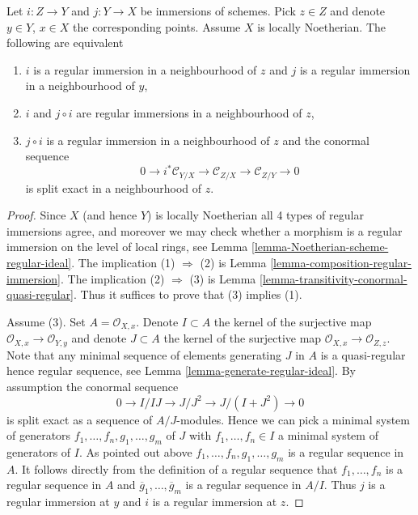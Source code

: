 \begin{lemma}
\label{lemma-extra-permanence-regular-immersion-noetherian}
Let $i : Z \to Y$ and $j : Y \to X$ be immersions of schemes.
Pick $z \in Z$ and denote $y \in Y$, $x \in X$ the corresponding points.
Assume $X$ is locally Noetherian.
The following are equivalent
\begin{enumerate}
\item $i$ is a regular immersion in a neighbourhood of $z$ and $j$
is a regular immersion in a neighbourhood of $y$,
\item $i$ and $j \circ i$ are regular immersions in a neighbourhood of $z$,
\item $j \circ i$ is a regular immersion in a neighbourhood of $z$ and the
conormal sequence
$$
0 \to i^*\mathcal{C}_{Y/X} \to
\mathcal{C}_{Z/X} \to
\mathcal{C}_{Z/Y} \to 0
$$
is split exact in a neighbourhood of $z$.
\end{enumerate}
\end{lemma}

\begin{proof}
Since $X$ (and hence $Y$) is locally Noetherian all 4 types of regular
immersions agree, and moreover we may check whether a morphism is a
regular immersion on the level of local rings, see
Lemma \ref{lemma-Noetherian-scheme-regular-ideal}.
The implication (1) $\Rightarrow$ (2) is
Lemma \ref{lemma-composition-regular-immersion}.
The implication (2) $\Rightarrow$ (3) is
Lemma \ref{lemma-transitivity-conormal-quasi-regular}.
Thus it suffices to prove that (3) implies (1).

\medskip\noindent
Assume (3). Set $A = \mathcal{O}_{X, x}$. Denote $I \subset A$ the kernel
of the surjective map $\mathcal{O}_{X, x} \to \mathcal{O}_{Y, y}$ and
denote $J \subset A$ the kernel
of the surjective map $\mathcal{O}_{X, x} \to \mathcal{O}_{Z, z}$.
Note that any minimal sequence of elements generating $J$ in $A$
is a quasi-regular hence regular sequence, see
Lemma \ref{lemma-generate-regular-ideal}.
By assumption the conormal sequence
$$
0 \to I/IJ \to J/J^2 \to J/(I + J^2) \to 0
$$
is split exact as a sequence of $A/J$-modules. Hence we can pick
a minimal system of generators $f_1, \ldots, f_n, g_1, \ldots, g_m$
of $J$ with $f_1, \ldots, f_n \in I$ a minimal system of generators of $I$.
As pointed out above $f_1, \ldots, f_n, g_1, \ldots, g_m$ is a regular
sequence in $A$. It follows directly from the definition of a regular
sequence that $f_1, \ldots, f_n$ is a regular sequence in $A$ and
$\overline{g}_1, \ldots, \overline{g}_m$ is a regular sequence in
$A/I$. Thus $j$ is a regular immersion at $y$ and $i$ is a regular
immersion at $z$.
\end{proof}

